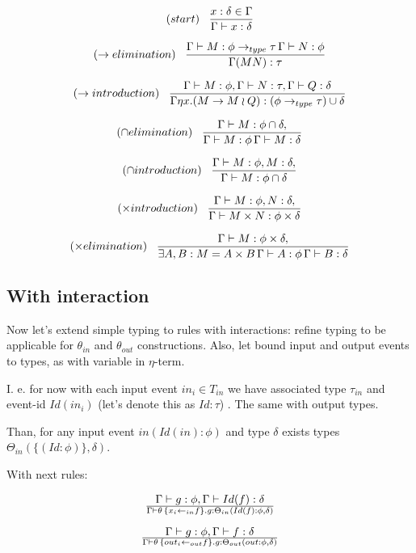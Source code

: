 \documentclass[10pt]{article}
\begin{document}
$$
 (start)\,\,\,\,\,
 {
  {x:\delta \in \Gamma} \over {\Gamma \vdash x:\delta }
 }
$$ 

$$
 (\to elimination)\,\,\,\,\,
{
 {\Gamma \vdash M: \phi \to_{type} \tau\,
  \Gamma \vdash N: \phi  
 } 
 \over 
 {\Gamma (M N):\tau  }
 }
$$ 

$$
 (\to introduction)\,\,\,\,\,
{	
 {\Gamma \vdash M: \phi,
  \Gamma \vdash N: \tau,
  \Gamma \vdash Q: \delta
 } 
 \over 
 {\Gamma \eta x. (M \to M \wr Q): (\phi \to_{type} \tau) \cup \delta }
 }
$$ 

$$
 (\cap elimination)\,\,\,\,\,
{	
 {\Gamma \vdash M: \phi \cap \delta,
 } 
 \over 
 {\Gamma \vdash M:\phi \, \Gamma \vdash M:\delta }
 }
$$

$$
 (\cap introduction)\,\,\,\,\,
{	
 {\Gamma \vdash M: \phi, M: \delta,
 } 
 \over 
 {\Gamma \vdash M: \phi \cap \delta }
 }
$$

$$
 (\times introduction)\,\,\,\,\,
{	
 {\Gamma \vdash M: \phi, N: \delta,
 } 
 \over 
 {\Gamma \vdash M \times N: \phi \times \delta }
 }
$$
 
$$
 (\times elimination)\,\,\,\,\,
{	
 {\Gamma \vdash M: \phi \times \delta,
 } 
 \over 
 {\exists A, B: M=A\times B\, \Gamma \vdash A : \phi \, \Gamma \vdash B: \delta }
 }
$$
 
\subsection{ With interaction }

 Now let's extend simple typing to rules with interactions: refine typing to be applicable
for $\theta_{in}$ and $\theta_{out}$ constructions. Also, let bound input and output
events to types, as with variable in $\eta$-term.  

I. e. for now with each input event ${in}_{i} \in T_{in}$ we have associated type  
$\tau_{in}$  and event-id $Id(in_{i})$ (let's denote this as $Id : \tau$) . 
The same with output types.

Than, for any input event $in(Id(in):\phi)$ and type $\delta$ exists types 
  $\Theta_{in}( \{(Id:\phi)\}, \delta)$.

  
 With next rules: 
   
  $$ 
    \Gamma \vdash g : \phi, 
    \Gamma \vdash  Id(f) : \delta
    \over 
   \Gamma \vdash \theta\, \{x_i {\leftarrow_{in}} f\}.g : \Theta_{in}( Id(f):\phi,\delta) 
   $$

  $$
    \Gamma \vdash g : \phi, 
    \Gamma \vdash  f : \delta
    \over 
   \Gamma \vdash \theta\, \{out_i {\leftarrow_{out}} f\}.g : \Theta_{out}(out:\phi,\delta) 
  $$
\end{document}
